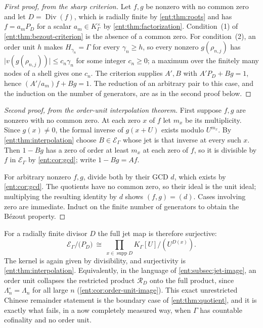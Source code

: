 \documentclass[11pt]{article}
\theoremstyle{plain}
\theoremstyle{plain}
\theoremstyle{plain}
\theoremstyle{definition}
\theoremstyle{definition}
\theoremstyle{definition}
\theoremstyle{definition}
\theoremstyle{remark}
\newcommand{\K}{K_\Gamma}\newcommand{\KD}{K_\Delta}
\newcommand{\E}{\mathcal E_\Gamma}
\DeclareMathOperator{\supp}{supp}\DeclareMathOperator{\lc}{lc}
\DeclareMathOperator{\Div}{Div}\DeclareMathOperator{\inpol}{in}
\newcommand{\RD}{\mathcal R_D}\newcommand{\Ucal}{\mathcal U}
\newcommand{\abs}[1]{\lvert#1\rvert}
\begin{document}
\begin{proof}[First proof, from the sharp criterion]
Let $f,g$ be nonzero with no common zero and let $D=\Div(f)$, which is
radially finite by \cref{ent:thm:roots} and has $f=a_mP_D$ for a scalar
$a_m\in\K^\times$ by \cref{ent:thm:factorization}. Condition~(1) of
\cref{ent:thm:bezout-criterion} is the absence of a common zero. For
condition~(2), an order unit $h$ makes $H_{\gamma_n}=\Gamma$ for every
$\gamma_n\ge h$, so every nonzero $g(\rho_{n,j})$ has
$\abs{v(g(\rho_{n,j}))}\le c_n\gamma_n$ for some integer $c_n\ge0$; a maximum
over the finitely many nodes of a shell gives one $c_n$. The criterion
supplies $A',B$ with $A'P_D+Bg=1$, hence $(A'/a_m)f+Bg=1$. The reduction of
an arbitrary pair to this case, and the induction on the number of
generators, are as in the second proof below.
\end{proof}
\begin{proof}[Second proof, from the order-unit interpolation theorem]
First suppose $f,g$ are nonzero with no common zero. At each zero $x$ of $f$
let $m_x$ be its multiplicity. Since $g(x)\ne0$, the formal inverse of
$g(x+U)$ exists modulo $U^{m_x}$. By \cref{ent:thm:interpolation} choose
$B\in\E$ whose jet is that inverse at every such $x$. Then $1-Bg$ has a zero
of order at least $m_x$ at each zero of $f$, so it is divisible by $f$ in
$\E$ by \cref{ent:cor:gcd}; write $1-Bg=Af$.

For arbitrary nonzero $f,g$, divide both by their GCD $d$, which exists by
\cref{ent:cor:gcd}. The quotients have no common zero, so their ideal is the
unit ideal; multiplying the resulting identity by $d$ shows $(f,g)=(d)$.
Cases involving zero are immediate. Induct on the finite number of generators
to obtain the B\'ezout property.
\end{proof}

For a radially finite divisor $D$ the full jet map is therefore surjective:
\[
 \E\big/\bigl(P_D\bigr)
 \ \cong\ \prod_{x\in\supp D}\K[U]/(U^{D(x)}).
\]
The kernel is again given by divisibility, and surjectivity is
\cref{ent:thm:interpolation}. Equivalently, in the language of
\cref{ent:subsec:jet-image}, an order unit collapses the restricted product
$\RD$ onto the full product, since $\Lambda_n^\circ=\Lambda_n$ for all large
$n$ (\cref{ent:cor:order-unit-image}). This exact unrestricted Chinese
remainder statement is the boundary case of \cref{ent:thm:quotient}, and it
is exactly what fails, in a now completely measured way, when $\Gamma$ has
countable cofinality and no order unit.
\end{document}
